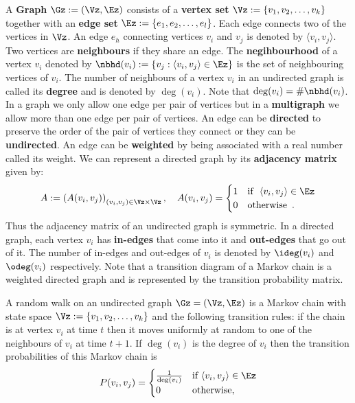 \begin{definition}[Graph]\label{D:Graph}
A {\bf Graph} $\Gz := (\Vz,\Ez)$ consists of a {\bf vertex set} $\Vz := \{v_1,v_2,\ldots,v_k\}$ together with an {\bf edge set} $\Ez := \{e_1,e_2,\ldots,e_l\}$.  Each edge connects two of the vertices in $\Vz$.  An edge $e_h$ connecting vertices $v_i$ and $v_j$ is denoted by $\langle v_i, v_j \rangle$.  Two vertices are {\bf neighbours} if they share an edge.  
The {\bf negihbourhood} of a vertex $v_i$ denoted by $\nbhd(v_i):=\left\{v_j : \langle v_i,v_j\rangle \in \Ez \right\}$ is the set of neighbouring vertices of $v_i$.  
The number of neighbours of a vertex $v_i$ in an undirected graph is called its {\bf degree} and is denoted by $\deg(v_i)$.  
Note that $\deg(v_i) = \# \nbhd(v_i)$.  
In a graph we only allow one edge per pair of vertices but in a {\bf multigraph} we allow more than one edge per pair of vertices.  
An edge can be {\bf directed} to preserve  the order of the pair of vertices they connect or they can be {\bf undirected}.  
An edge can be {\bf weighted} by being associated with a real number called its weight.  
We can represent a directed graph by its {\bf adjacency matrix} given by:
\[
A := \left( A(v_i,v_j) \right)_{(v_i,v_j) \in \Vz \times \Vz}, \quad 
A(v_i,v_j) = 
\begin{cases} 
1 & \text{if } \  \langle v_i, v_j \rangle \in \Ez \\
0 & \text{otherwise} \enspace .
\end{cases}
\]
Thus the adjacency matrix of an undirected graph is symmetric.  
In a directed graph, each vertex $v_i$ has {\bf in-edges} that come into it and {\bf out-edges} that go out of it.  
The number of in-edges and out-edges of $v_i$ is denoted by $\ideg(v_i)$ and $\odeg(v_i)$ respectively.  
Note that a transition diagram of a Markov chain is a weighted directed graph and is represented by the transition probability matrix.
\end{definition}

\begin{model}\label{M:RWGraph}
A random walk on an undirected graph $\Gz=(\Vz,\Ez)$ is a Markov chain with state space $\Vz:= \{v_1,v_2,\ldots,v_k\}$ and the following transition rules: if the chain is at vertex $v_i$ at time $t$ then it moves uniformly at random to one of the neighbours of $v_i$ at time $t+1$.  If $\deg(v_i)$ is the degree of $v_i$ then the transition probabilities of this Markov chain is
\[
P(v_i,v_j) = 
\begin{cases}
\frac{1}{\deg(v_i)} & \text{if $\langle v_i, v_j \rangle \in \Ez$}\\
0 & \text{otherwise} ,
\end{cases}
\]
\end{model}

